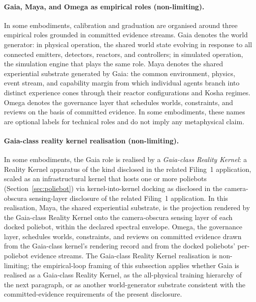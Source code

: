 \documentclass[a4paper,12pt]{article}
\newcommand{\RK}{Reality Kernel\xspace}
\begin{document}

\paragraph{Gaia, Maya, and Omega as empirical roles (non-limiting).}

In some embodiments, calibration and graduation are organised around
three empirical roles grounded in committed evidence streams. Gaia
denotes the world generator: in physical operation, the shared world
state evolving in response to all connected emitters, detectors,
reactors, and controllers; in simulated operation, the simulation
engine that plays the same role. Maya denotes the shared experiential
substrate generated by Gaia: the common environment, physics, event
stream, and capability margin from which individual agents branch into
distinct experience cones through their reactor configurations and
Kosha regimes. Omega denotes the governance layer that schedules
worlds, constraints, and reviews on the basis of committed evidence.
In some embodiments, these names are optional labels for technical
roles and do not imply any metaphysical claim.

\paragraph{Gaia-class reality kernel realisation (non-limiting).}
In some embodiments, the Gaia role is realised by a \emph{Gaia-class
\RK}: a \RK apparatus of the kind disclosed in
the related Filing~1 application, scaled as an infrastructural kernel
that hosts one or more poliebots (Section~\ref{sec:poliebot}) via
kernel-into-kernel docking as disclosed in the camera-obscura sensing-layer disclosure of the related Filing~1 application. In this realisation, Maya, the shared
experiential substrate, is the projection rendered by the Gaia-class
\RK onto the camera-obscura sensing layer of each docked
poliebot, within the declared spectral envelope. Omega, the
governance layer, schedules worlds, constraints, and reviews on
committed evidence drawn from the Gaia-class kernel's rendering
record and from the docked poliebots' per-poliebot evidence streams.
The Gaia-class \RK realisation is non-limiting; the
empirical-loop framing of this subsection applies whether Gaia is
realised as a Gaia-class \RK, as the all-physical training
hierarchy of the next paragraph, or as another world-generator
substrate consistent with the committed-evidence requirements of the
present disclosure.
\end{document}
